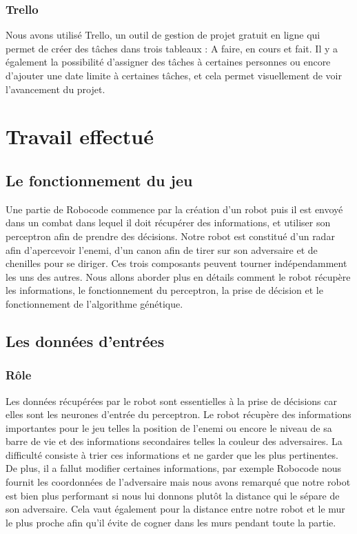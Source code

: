 \documentclass[12pt]{article}
\begin{document}
\subsubsection{Trello}
Nous avons utilisé Trello, un outil de gestion de projet gratuit en ligne qui permet de créer des tâches dans trois tableaux : A faire, en cours et fait. Il y a également la possibilité d'assigner des tâches à certaines personnes ou encore d'ajouter une date limite à certaines tâches, et cela permet visuellement de voir l'avancement du projet.

\newpage

\section{Travail effectué}
\subsection{Le fonctionnement du jeu}
Une partie de Robocode commence par la création d'un robot puis il est envoyé dans un combat dans lequel il doit récupérer des informations, et utiliser son perceptron afin de prendre des décisions. Notre robot est constitué d'un radar afin d'apercevoir l'enemi, d'un canon afin de tirer sur son adversaire et de chenilles pour se diriger. Ces trois composants peuvent tourner indépendamment les uns des autres. Nous allons aborder plus en détails comment le robot récupère les informations, le fonctionnement du perceptron, la prise de décision et le fonctionnement de l'algorithme génétique.

\subsection{Les données d'entrées}

\subsubsection{Rôle}
Les données récupérées par le robot sont essentielles à la prise de décisions car elles sont les neurones d'entrée du perceptron. Le robot récupère des informations importantes pour le jeu telles la position de l'enemi ou encore le niveau de sa barre de vie et des informations secondaires telles la couleur des adversaires. La difficulté consiste à trier ces informations et ne garder que les plus pertinentes. De plus, il a fallut modifier certaines informations, par exemple Robocode nous fournit les coordonnées de l'adversaire mais nous avons remarqué que notre robot est bien plus performant si nous lui donnons plutôt la distance qui le sépare de son adversaire. Cela vaut également pour la distance entre notre robot et le mur le plus proche afin qu'il évite de cogner dans les murs pendant toute la partie.
\end{document}
